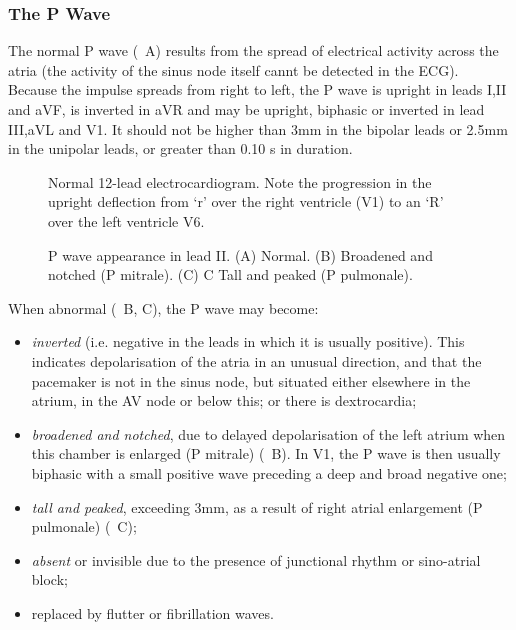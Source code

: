 \subsubsection{The P Wave}
The normal P wave (~A) results from the spread of electrical activity across the
atria (the activity of the sinus node itself cannt be detected in the
ECG). Because the impulse spreads from right to left, the P wave is upright in
leads I,II and aVF, is inverted in aVR and may be upright, biphasic or
inverted in lead III,aVL and V1. It should not be higher than 3mm in the
bipolar leads or 2.5mm in the unipolar leads, or greater than 0.10 s in duration.

\begin{figure}[htbp] \centering
 \caption[Normal 12-lead electrocardiogram.]{Normal 12-lead
   electrocardiogram. Note the progression in the upright deflection from `r'
   over the right ventricle (V1) to an `R' over the left ventricle V6.}
 \label{fig:normalecg}
\end{figure}

\begin{figure}[htbp] \centering
 \caption[P wave appearance in lead II.]{P wave appearance in lead II. (A) Normal. (B) Broadened and
   notched (P mitrale). (C) C Tall and peaked (P pulmonale).}
 \label{fig:pwaves}
\end{figure}

When abnormal (~B, C), the P wave may become:
\begin{itemize}
\item \emph{inverted} (i.e. negative in the leads in which it is usually
  positive). This indicates depolarisation of the atria in an unusual
  direction, and that the pacemaker is not in the sinus node, but situated
  either elsewhere in the atrium, in the AV node or below this; or there is dextrocardia;
\item \emph{broadened and notched}, due to delayed depolarisation of the left atrium
 when this chamber is enlarged (P mitrale) (~B). In  V1, the P wave is then
 usually biphasic with a small positive wave preceding a deep and broad
 negative one;
\item \emph{tall and peaked}, exceeding 3mm, as a result of right atrial
  enlargement (P pulmonale) (~C);
\item \emph{absent} or invisible due to the presence of junctional rhythm or
  sino-atrial block;
\item replaced by flutter or fibrillation waves.
\end{itemize}

